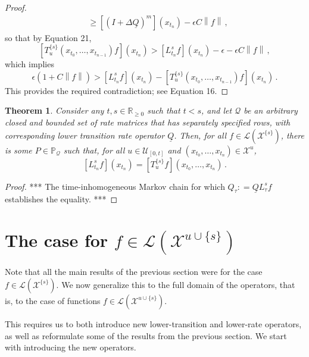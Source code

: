 \documentclass[a4paper,reqno]{amsart}
\newtheorem{theorem}{Theorem}
\newcommand{\reals}{\mathbb{R}}
\newcommand{\realsnonneg}{\reals_{\geq 0}}
\newcommand{\states}{\mathcal{X}}
\newcommand{\gambles}{\mathcal{L}}
\newcommand{\lrate}{\underline{Q}}
\newcommand{\norm}[1]{\left\lVert #1 \right\rVert}
\newcommand{\coloneqq}{:\!=}
\begin{document}
\begin{proof}
\begin{align*}
&\geq \left[\left(I+\Delta\lrate\right)^m\right](x_{t_n}) - \epsilon C\norm{f}\,,
\end{align*}
so that by Equation 21,
\begin{equation*}
\left[T_u^{\{s\}}(x_{t_0},\ldots,x_{t_{n-1}})f\right](x_{t_n}) > \left[L_{t_n}^sf\right](x_{t_n}) - \epsilon -\epsilon C\norm{f}\,,
\end{equation*}
which implies
\begin{equation*}
\epsilon(1 + C\norm{f}) > \left[L_{t_n}^sf\right](x_{t_n}) - \left[T_u^{\{s\}}(x_{t_0},\ldots,x_{t_{n-1}})f\right](x_{t_n})\,.
\end{equation*}
This provides the required contradiction; see Equation 16.
\end{proof}

\begin{theorem}\label{theorem:nonmarkov_single_variable_lower_envelope}
Consider any $t,s\in\realsnonneg$ such that $t<s$, and let $\mathcal{Q}$ be an arbitrary closed and bounded set of rate matrices that has separately specified rows, with corresponding lower transition rate operator $\lrate$. Then, for all $f\in\gambles(\states^{\{s\}})$, there is some $P\in\mathbb{P}_\mathcal{Q}$ such that, for all $u\in\mathcal{U}_{[0,t]}$ and $(x_{t_0},\ldots,x_{t_n})\in\states^u$,
\begin{equation*}
\left[L_{t_n}^{s}f\right](x_{t_n}) = \left[T_{u}^{\{s\}}f\right](x_{t_0},\ldots,x_{t_n})\,.
\end{equation*}
\end{theorem}
\begin{proof}
*** The time-inhomogeneous Markov chain for which $Q_{\tau}\coloneqq \lrate L_{\tau}^sf$ establishes the equality. ***
\end{proof}

\section{The case for $f\in\gambles(\states^{u\cup\{s\}})$ }

Note that all the main results of the previous section were for the case $f\in\gambles(\states^{\{s\}})$. We now generalize this to the full domain of the operators, that is, to the case of functions $f\in\gambles(\states^{u\cup\{s\}})$.

This requires us to both introduce new lower-transition and lower-rate operators, as well as reformulate some of the results from the previous section. We start with introducing the new operators.
\end{document}
